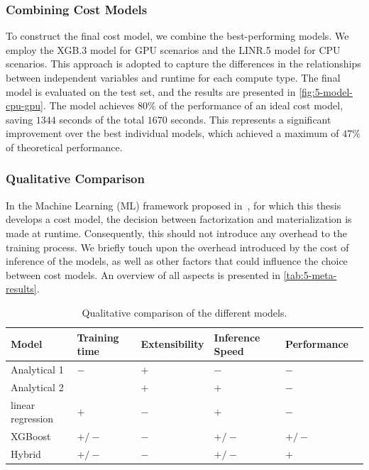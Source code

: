 \subsubsection{Combining Cost Models}
\label{subsec:5-hybrid}
To construct the final cost model, we combine the best-performing models. We employ the XGB.3 model for GPU scenarios and the LINR.5 model for CPU scenarios. This approach is adopted to capture the differences in the relationships between independent variables and runtime for each compute type. The final model is evaluated on the test set, and the results are presented in \autoref{fig:5-model-cpu-gpu}. The model achieves $80\%$ of the performance of an ideal cost model, saving $1344$ seconds of the total $1670$ seconds. This represents a significant improvement over the best individual models, which achieved a maximum of $47\%$ of theoretical performance.

\subsubsection{Qualitative Comparison}
In the Machine Learning (ML) framework proposed in~\cite{amalur}, for which this thesis develops a cost model, the decision between factorization and materialization is made at runtime. Consequently, this should not introduce any overhead to the training process. We briefly touch upon the overhead introduced by the cost of inference of the models, as well as other factors that could influence the choice between cost models. An overview of all aspects is presented in \autoref{tab:5-meta-results}.

\begin{table}[ht]
  \centering
  \begin{tabular}{llllll}
    \toprule
    Model             & Training time & Extensibility & Inference Speed & Performance \\
    \midrule
    Analytical 1      & $-$           & $+$           & $-$             & $-$         \\
    Analytical 2      &               & $+$           & $+$             & $-$         \\
    linear regression & $+$           & $-$           & $+$             & $-$         \\
    XGBoost           & $+/-$         & $-$           & $+/-$           & $+/-$       \\
    Hybrid            & $+/-$         & $-$           & $+/-$           & $+$         \\
    \bottomrule
  \end{tabular}

  \caption{Qualitative comparison of the different models.}
  \label{tab:5-meta-results}
\end{table}


